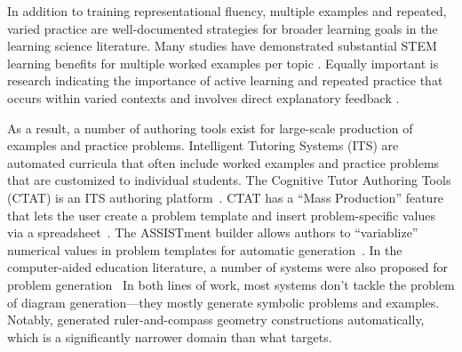 In addition to training representational fluency, multiple examples and repeated, varied practice are well-documented strategies for broader learning goals in the learning science literature. Many studies have demonstrated substantial STEM learning benefits for multiple worked examples per topic \cite{PBB07}. Equally important is research indicating the importance of active learning \cite{CW14, DMM19} and repeated practice \cite{deliberatePractice, SSL98} that occurs within varied contexts \cite{PV94, RT07} and involves direct explanatory feedback \cite{perceptualLearning}.

As a result, a number of authoring tools exist for large-scale production of examples and practice problems. Intelligent Tutoring Systems (ITS) are automated curricula that often include worked examples and practice problems that are customized to individual students. The Cognitive Tutor Authoring Tools (CTAT) is an ITS authoring platform~\cite{CTAT}. CTAT has a ``Mass Production'' feature that lets the user create a problem template and insert problem-specific values via a spreadsheet~\cite{massProduction}. The ASSISTment builder allows authors to ``variablize” numerical values in problem templates for automatic generation~\cite{ASSISTment}. In the computer-aided education literature, a number of systems were also proposed for problem generation~\cite{compEduCACM, synthDeduction, synthGeometry} In both lines of work, most systems don’t tackle the problem of diagram generation—they mostly generate symbolic problems and examples. Notably, \citet{synthGeometry} generated ruler-and-compass geometry constructions automatically, which is a significantly narrower domain than what \Edgeworth targets. 